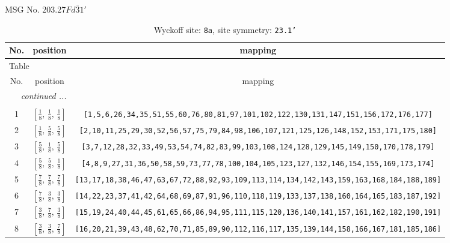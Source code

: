 \documentclass[fleqn,8pt]{jsarticle}
\begin{document}
\setcounter{MaxMatrixCols}{32}

\renewcommand{\tablename}{Table~}
\renewcommand{\figurename}{Figure~}
\begin{center}
\LARGE
MSG No. 203.27\quad$Fd\bar{3}1'$
\end{center}
\renewcommand{\arraystretch}{1.2}
\begin{longtable}{ccc}
\caption{Wyckoff site: {\tt 8a}, site symmetry: {\tt 23.1'}}
 \\
 \hline \hline
No. & position & mapping \\ \hline \endfirsthead

\multicolumn{2}{l}{\tablename\ \thetable{}} \\
 \hline \hline
No. & position & mapping \\ \hline \endhead

 \hline \hline
\multicolumn{2}{r}{\footnotesize\it continued ...} \\ \endfoot

 \hline \hline
\multicolumn{2}{r}{} \\ \endlastfoot

1 & $\left[ \frac{1}{8},\, \frac{1}{8},\, \frac{1}{8} \right]$ & {\tt [1,5,6,26,34,35,51,55,60,76,80,81,97,101,102,122,130,131,147,151,156,172,176,177]} \\ \hline
2 & $\left[ \frac{1}{8},\, \frac{5}{8},\, \frac{5}{8} \right]$ & {\tt [2,10,11,25,29,30,52,56,57,75,79,84,98,106,107,121,125,126,148,152,153,171,175,180]} \\ \hline
3 & $\left[ \frac{5}{8},\, \frac{1}{8},\, \frac{5}{8} \right]$ & {\tt [3,7,12,28,32,33,49,53,54,74,82,83,99,103,108,124,128,129,145,149,150,170,178,179]} \\ \hline
4 & $\left[ \frac{5}{8},\, \frac{5}{8},\, \frac{1}{8} \right]$ & {\tt [4,8,9,27,31,36,50,58,59,73,77,78,100,104,105,123,127,132,146,154,155,169,173,174]} \\ \hline
5 & $\left[ \frac{7}{8},\, \frac{7}{8},\, \frac{7}{8} \right]$ & {\tt [13,17,18,38,46,47,63,67,72,88,92,93,109,113,114,134,142,143,159,163,168,184,188,189]} \\ \hline
6 & $\left[ \frac{7}{8},\, \frac{3}{8},\, \frac{3}{8} \right]$ & {\tt [14,22,23,37,41,42,64,68,69,87,91,96,110,118,119,133,137,138,160,164,165,183,187,192]} \\ \hline
7 & $\left[ \frac{3}{8},\, \frac{7}{8},\, \frac{3}{8} \right]$ & {\tt [15,19,24,40,44,45,61,65,66,86,94,95,111,115,120,136,140,141,157,161,162,182,190,191]} \\ \hline
8 & $\left[ \frac{3}{8},\, \frac{3}{8},\, \frac{7}{8} \right]$ & {\tt [16,20,21,39,43,48,62,70,71,85,89,90,112,116,117,135,139,144,158,166,167,181,185,186]} \\
\end{longtable}
\end{document}
